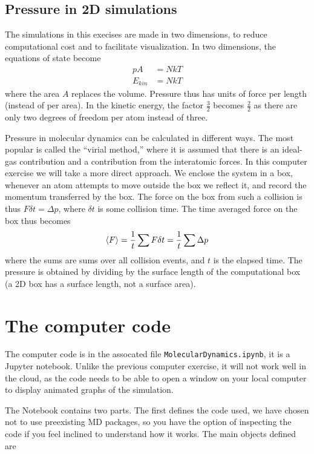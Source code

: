 \documentclass[a4paper,11pt]{article}
\begin{document}
\subsection{Pressure in 2D simulations}
\label{sec:pressure}

The simulations in this execises are made in two dimensions, to reduce
computational cost and to facilitate visualization.  In two
dimensions, the equations of state become
\begin{align}
  \label{eq:ideal}
  p A &= N k T\\
  E_{kin} &= N k T 
\end{align}
where the area $A$ replaces the volume.  Pressure thus has units of
force per length (instead of per area).  In the kinetic energy, the
factor $\frac32$ becomes $\frac22$ as there are only two degrees of
freedom per atom instead of three.

Pressure in molecular dynamics can be calculated in different ways.
The most popular is called the ``virial method,'' where it is assumed that
there is an ideal-gas contribution and a contribution from the
interatomic forces.  In this computer exercise we will take a more
direct approach.  We enclose the system in a box, whenever an atom
attempts to move outside the box we reflect it, and record the
momentum transferred by the box.  The force on the box from such a
collision is thus $F \delta t = \Delta p$, where $\delta t$ is some
collision time.  The time averaged force on the box thus becomes
\begin{equation}
  \label{eq:5}
  \left< F \right> = {1 \over t} \sum F \delta t = {1 \over t} \sum
  \Delta p
\end{equation}
where the sums are sums over all collision events, and $t$ is the
elapsed time.  The pressure is obtained by dividing by the surface length of
the computational box (a 2D box has a surface length, not a surface
area).


\section{The computer code}

The computer code is in the assocated file \texttt{MolecularDynamics.ipynb},
it is a Jupyter notebook.  Unlike the previous computer exercise, it
will not work well in the cloud, as the code needs to be able to open
a window on your local computer to display animated graphs of the
simulation.

The Notebook contains two parts.  The first defines the code used, we
have chosen not to use preexisting MD packages, so you have the option
of inspecting the code if you feel inclined to understand how it
works.  The main objects defined are
\end{document}
